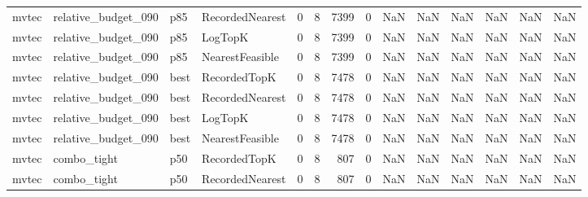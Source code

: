 \begin{tabular}{llllrrrrrrrrrr}
   mvtec &  relative\_budget\_090 &    p85 & RecordedNearest &           0 &          8 &           7399 &                   0 &            NaN &             NaN &                       NaN &            NaN &                    NaN &                     NaN \\
   mvtec &  relative\_budget\_090 &    p85 &         LogTopK &           0 &          8 &           7399 &                   0 &            NaN &             NaN &                       NaN &            NaN &                    NaN &                     NaN \\
   mvtec &  relative\_budget\_090 &    p85 & NearestFeasible &           0 &          8 &           7399 &                   0 &            NaN &             NaN &                       NaN &            NaN &                    NaN &                     NaN \\
   mvtec &  relative\_budget\_090 &   best &    RecordedTopK &           0 &          8 &           7478 &                   0 &            NaN &             NaN &                       NaN &            NaN &                    NaN &                     NaN \\
   mvtec &  relative\_budget\_090 &   best & RecordedNearest &           0 &          8 &           7478 &                   0 &            NaN &             NaN &                       NaN &            NaN &                    NaN &                     NaN \\
   mvtec &  relative\_budget\_090 &   best &         LogTopK &           0 &          8 &           7478 &                   0 &            NaN &             NaN &                       NaN &            NaN &                    NaN &                     NaN \\
   mvtec &  relative\_budget\_090 &   best & NearestFeasible &           0 &          8 &           7478 &                   0 &            NaN &             NaN &                       NaN &            NaN &                    NaN &                     NaN \\
   mvtec &          combo\_tight &    p50 &    RecordedTopK &           0 &          8 &            807 &                   0 &            NaN &             NaN &                       NaN &            NaN &                    NaN &                     NaN \\
   mvtec &          combo\_tight &    p50 & RecordedNearest &           0 &          8 &            807 &                   0 &            NaN &             NaN &                       NaN &            NaN &                    NaN &                     NaN \\

\end{tabular}
